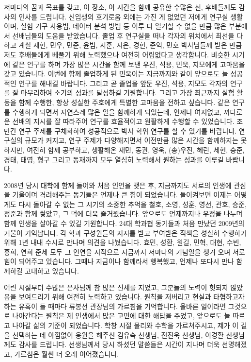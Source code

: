 저마다의 꿈과 목표를 갖고, 이 장소, 이 시간을 함께 공유한 수많은 선, 후배들께도 감사의 인사를 드립니다. 신입생의 호기로움 외에는 가진 게 없었던 저에게 연구실 생활이며, 실험 기구 사용법, 데이터 분석 방법 등 이루 다 열거할 수 없을 만큼 많은 부분에서 선배님들의 도움을 받았습니다. 졸업 후 연구실을 떠나 각자의 위치에서 최선을 다하고 계실 재현, 민우, 민준, 윤범, 지훈, 지은, 경현, 준억, 민호 박사님들께 받은 만큼 저도 후배들에게 베풀기 위해 노력했으나 여전히 어림없다고 생각합니다. 비슷한 시기에 같은 연구를 하며 가장 많은 시간을 함께 보낸 우진, 석용, 민욱, 지모에게 고마움을 갖고 있습니다. 이번에 함께 졸업하게 된 민욱이는 지금까지와 같이 앞으로도 늘 성공적인 연구를 해내길 바랍니다. 그리고 곧 졸업을 앞둔 우진, 석용, 지모도 각자의 연구를 잘 마무리하여 소기의 성과를 달성하길 기원합니다. 그리고 가장 최근까지 실험 활동을 함께 수행한, 항상 성실한 주호에게 특별한 고마움을 전하고 싶습니다. 같은 연구를 수행하게 되면서 자연스레 많은 일을 함께하게 되었는데, 언제나 여지없고, 까다로운 선배의 지시를 잘 따라주어 연구를 효율적이고 원활하게 수행할 수 있었습니다. 조만간 연구 주제를 구체화하여 성공적으로 박사 학위 연구를 할 수 있기를 바랍니다. 연구실의 규모가 커지고, 연구 주제가 다양해지면서 이전만큼 많은 시간을 함께하지는 못하지만, 여전히 함께 공부하고, 생활해온 재민, 동권, 영욱, (송)우진, 혜린, 세현, 승준, 경태, 태영, 형구 그리고 동재까지 모두 열심히 노력해서 원하는 성과를 이루길 바랍니다.

2008년 당시 대학에 함께 들어와 처음 인연을 맺은 후, 지금까지도 서로의 인생에 관심을 기울이며 격려해주는 동기들은 언제나 큰 힘이 되었습니다. 돌이켜보면 이제는 어떻게도 다시 돌아갈 수 없는 그 시기의 소중한 추억을 철호, 소영, 성훈, 영선, 관호, 승준, 정준과 함께 쌓았고, 그 덕에 더욱 즐거웠습니다. 앞으로도 언제까지나 우정을 나누며 함께 인생을 살아갈 수 있길 기원합니다. 24대 학과협 동기들과 처음 만났던 2009년의 겨울이 기억납니다. 각 학과 구성원들의 지지를 받고 부여받은 직책을 성실히 수행하기 위해 1년 내내 수시로 만나며 의견을 나눴습니다. 효민, 성환, 원길, 민혁, 대현, 수빈, 홍희, 연희 준세 모두 그 인연을 시작으로 지금까지 저마다의 기념일을 챙겨 오며 서로 힘이 되어주고 있습니다. 그때나 지금이나 함께라서 행복했고, 언제나 또다시 만나 함께하길 고대하고 있습니다.

어린 시절부터 수많은 은사님께 참 많은 신세를 지었고, 그분들의 노력이 헛되지 않았음을 보여드리기 위해 여전히 노력하고 있습니다. 원칙을 저버리고 현실과 타협하고자 하는 유혹이 들 때마다 류봉선 관장님의 가르침을 기억합니다. 올바른 일이라면 그것으로 나아간다는 원칙은 제 인생에서 많은 고민에 대한 해답을 주었고, 앞으로도 늘 따르고 나아갈 삶의 기준이 되었습니다. 학창 시절 물리와 수학을 가르쳐주시고, 제가 이 길을 선택하는 데 아낌없이 응원을 해주신 김유숙 선생님, 전진욱 선생님, 이경환 선생님께도 감사를 드립니다. 선생님께서 당시 하셨던 말씀들은 시간이 지나며 더욱 선명해졌고, 가르침은 훨씬 더 오래 이어졌습니다.

